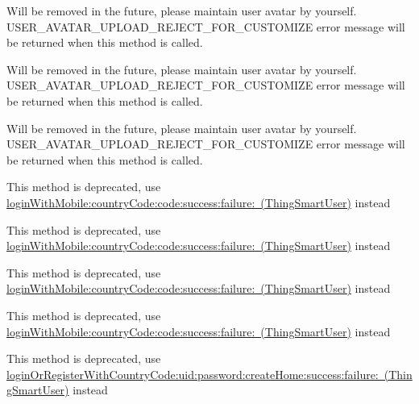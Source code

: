 \begin{DoxyRefList}
\label{deprecated__deprecated000219}%
%
Will be removed in the future, please maintain user avatar by yourself. USER\+\_\+\+AVATAR\+\_\+\+UPLOAD\+\_\+\+REJECT\+\_\+\+FOR\+\_\+\+CUSTOMIZE error message will be returned when this method is called. 

\label{deprecated__deprecated000229}%
%
Will be removed in the future, please maintain user avatar by yourself. USER\+\_\+\+AVATAR\+\_\+\+UPLOAD\+\_\+\+REJECT\+\_\+\+FOR\+\_\+\+CUSTOMIZE error message will be returned when this method is called. 

\label{deprecated__deprecated000209}%
%
Will be removed in the future, please maintain user avatar by yourself. USER\+\_\+\+AVATAR\+\_\+\+UPLOAD\+\_\+\+REJECT\+\_\+\+FOR\+\_\+\+CUSTOMIZE error message will be returned when this method is called.  
\item[(Deprecated\+Api) Member \mbox{\hyperlink{category_thing_smart_user_07_deprecated_api_08_ac619f14c04d50414d717baf0d5c1d528}{\mbox{[}Thing\+Smart\+User(Deprecated\+Api) login\+:phone\+Number\+:code\+:success\+:failure\+:\mbox{]}}} ]\label{deprecated__deprecated000222}%
%
This method is deprecated, use \mbox{\hyperlink{interface_thing_smart_user_aa34da902af338f59ab96429259b9cdd9}{login\+With\+Mobile\+:country\+Code\+:code\+:success\+:failure\+: (\+Thing\+Smart\+User)}} instead 

\label{deprecated__deprecated000202}%
%
This method is deprecated, use \mbox{\hyperlink{interface_thing_smart_user_aa34da902af338f59ab96429259b9cdd9}{login\+With\+Mobile\+:country\+Code\+:code\+:success\+:failure\+: (\+Thing\+Smart\+User)}} instead 

\label{deprecated__deprecated000232}%
%
This method is deprecated, use \mbox{\hyperlink{interface_thing_smart_user_aa34da902af338f59ab96429259b9cdd9}{login\+With\+Mobile\+:country\+Code\+:code\+:success\+:failure\+: (\+Thing\+Smart\+User)}} instead 

\label{deprecated__deprecated000212}%
%
This method is deprecated, use \mbox{\hyperlink{interface_thing_smart_user_aa34da902af338f59ab96429259b9cdd9}{login\+With\+Mobile\+:country\+Code\+:code\+:success\+:failure\+: (\+Thing\+Smart\+User)}} instead  
\item[(Deprecated\+Api) Member \mbox{\hyperlink{category_thing_smart_user_07_deprecated_api_08_a51488655cd25336c281cddc1b0705aca}{\mbox{[}Thing\+Smart\+User(Deprecated\+Api) login\+By\+Uid\+:password\+:country\+Code\+:success\+:failure\+:\mbox{]}}} ]\label{deprecated__deprecated000226}%
%
This method is deprecated, use \mbox{\hyperlink{interface_thing_smart_user_a2e848d4067bc3e9aed5a7db187ceecd6}{login\+Or\+Register\+With\+Country\+Code\+:uid\+:password\+:create\+Home\+:success\+:failure\+: (\+Thing\+Smart\+User)}} instead 


\end{DoxyRefList}

